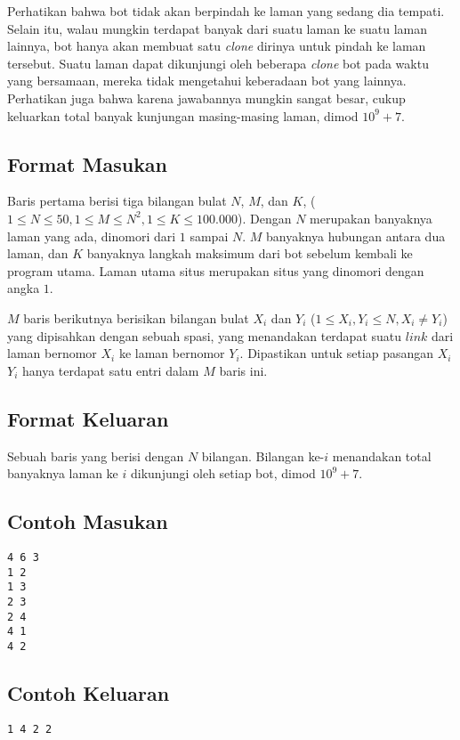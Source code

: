 \documentclass{article}
\begin{document}
Perhatikan bahwa bot tidak akan berpindah ke laman yang sedang dia tempati. Selain itu, walau mungkin terdapat banyak  dari suatu laman ke suatu laman lainnya, bot hanya akan membuat satu \textit{clone} dirinya untuk pindah ke laman tersebut. Suatu laman dapat dikunjungi oleh beberapa \textit{clone} bot pada waktu yang bersamaan, mereka tidak mengetahui keberadaan bot yang lainnya. Perhatikan juga bahwa karena jawabannya mungkin sangat besar, cukup keluarkan total banyak kunjungan masing-masing laman, dimod $10^9+7$.

\subsection*{Format Masukan}

Baris pertama berisi tiga bilangan bulat $N$, $M$, dan $K$, ($1 \leq N \leq 50, 1 \leq M \leq N^2, 1 \leq K \leq 100.000$). Dengan $N$ merupakan banyaknya laman yang ada, dinomori dari $1$ sampai $N$. $M$ banyaknya hubungan  antara dua laman, dan $K$ banyaknya langkah maksimum dari bot sebelum kembali ke program utama. Laman utama situs merupakan situs yang dinomori dengan angka $1$.

$M$ baris berikutnya berisikan bilangan bulat $X_i$ dan $Y_i$ ($1 \leq X_i, Y_i \leq N, X_i \ne Y_i$) yang dipisahkan dengan sebuah spasi, yang menandakan terdapat suatu $\textit{link}$ dari laman bernomor $X_i$ ke laman bernomor $Y_i$. Dipastikan untuk setiap pasangan $X_i$ $Y_i$ hanya terdapat satu entri dalam $M$ baris ini.

\subsection*{Format Keluaran}

Sebuah baris yang berisi dengan $N$ bilangan. Bilangan ke-$i$ menandakan total banyaknya laman ke $i$ dikunjungi oleh setiap bot, dimod $10^9+7$.
\\

\begin{multicols}{2}
\subsection*{Contoh Masukan}
\begin{lstlisting}
4 6 3
1 2
1 3
2 3
2 4
4 1
4 2
\end{lstlisting}
\columnbreak
\subsection*{Contoh Keluaran}
\begin{lstlisting}
1 4 2 2
\end{lstlisting}
\vfill
\null
\end{multicols}
\end{document}
